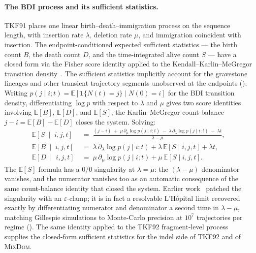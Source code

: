 \documentclass[11pt]{article}
\theoremstyle{definition}
\theoremstyle{remark}
\newcommand{\MixDom}{\textsc{MixDom}}
\newcommand{\E}{\mathbb{E}}
\begin{document}
\paragraph{The BDI process and its sufficient statistics.}
TKF91 places one linear birth--death--immigration process on the
sequence length, with insertion rate $\lambda$, deletion rate $\mu$,
and immigration coincident with insertion. The endpoint-conditioned
expected sufficient statistics --- the birth count $B$, the death
count $D$, and the time-integrated alive count $S$ --- have a
closed form via the Fisher score identity applied to the
Kendall--Karlin--McGregor transition density~\citep{Kendall1948}.
The sufficient statistics implicitly account for the
gravestone lineages and other transient
trajectory segments unobserved at the endpoints
().
Writing $p(j \mid i; t) = \E[\mathbf{1}\{N(t)=j\} \mid N(0)=i]$ for
the BDI transition density, differentiating $\log p$ with respect to
$\lambda$ and $\mu$ gives two score identities involving $\E[B]$,
$\E[D]$, and $\E[S]$; the Karlin--McGregor count-balance
$j - i = \E[B] - \E[D]$ closes the system. Solving:
\begin{equation}
\label{eq:bdi-suffstat}
\begin{aligned}
\E\!\left[S \;\middle|\; i, j, t\right]
  &\;=\; \frac{(j - i) \;+\; \mu \, \partial_\mu \log p(j \mid i; t)
              \;-\; \lambda \, \partial_\lambda \log p(j \mid i; t)
              \;-\; \lambda t}{\lambda - \mu}, \\[2pt]
\E\!\left[B \;\middle|\; i, j, t\right]
  &\;=\; \lambda \, \partial_\lambda \log p(j \mid i; t)
        + \lambda \, \E[S \mid i, j, t]
        + \lambda t, \\[2pt]
\E\!\left[D \;\middle|\; i, j, t\right]
  &\;=\; \mu \, \partial_\mu \log p(j \mid i; t)
        + \mu \, \E[S \mid i, j, t].
\end{aligned}
\end{equation}
The $\E[S]$ formula has a $0/0$ singularity at $\lambda=\mu$: the
$(\lambda - \mu)$ denominator vanishes, and the numerator vanishes too
as an automatic consequence of the same count-balance identity that
closed the system. Earlier work~\citep{CrawfordSuchard2012,Holmes2005Envelope}
patched the singularity with an $\varepsilon$-clamp; it is in fact a
resolvable L'H\^opital limit recovered exactly by differentiating
numerator and denominator a second time in $\lambda - \mu$, matching
Gillespie simulations to Monte-Carlo precision at $10^7$ trajectories
per regime (). The same identity applied to the
TKF92 fragment-level process supplies the closed-form sufficient
statistics for the indel side of TKF92 and of
\MixDom.
\end{document}
